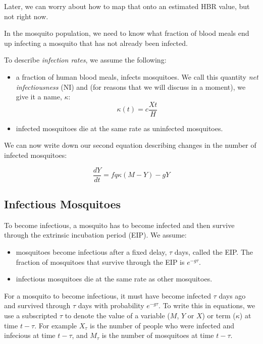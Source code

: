 \documentclass[
]{book}
\begin{document}
Later, we can worry about how to map that onto an estimated HBR value, but not right now.

In the mosquito population, we need to know what fraction of blood meals end up infecting a mosquito that has not already been infected.

To describe \emph{infection rates}, we assume the following:

\begin{itemize}
\item
  a fraction of human blood meals, infects mosquitoes. We call this quantity \emph{net infectiousness} (NI) and (for reasons that we will discuss in a moment), we give it a name, \(\kappa\): \[\kappa(t) = c \frac{X{t}}{H}\]
\item
  infected mosquitoes die at the same rate as uninfected mosquitoes.
\end{itemize}

We can now write down our second equation describing changes in the number of infected mosquitoes:

\begin{equation}
\frac{dY}{dt} = f q \kappa (M-Y) -g Y
\end{equation}

\hypertarget{infectious-mosquitoes}{%
\subsection{Infectious Mosquitoes}\label{infectious-mosquitoes}}

To become infectious, a mosquito has to become infected and then survive through the extrinsic incubation period (EIP). We assume:

\begin{itemize}
\item
  mosquitoes become infectious after a fixed delay, \(\tau\) days, called the EIP. The fraction of mosquitoes that survive through the EIP is \(e^{-g \tau}\).
\item
  infectious mosquitoes die at the same rate as other mosquitoes.
\end{itemize}

For a mosquito to become infectious, it must have become infected \(\tau\) days ago and survived through \(\tau\) days with probability \(e^{-g\tau}\). To write this in equations, we use a subscripted \(\tau\) to denote the value of a variable (\(M\), \(Y\) or \(X\)) or term (\(\kappa\)) at time \(t-\tau\). For example \(X_\tau\) is the number of people who were infected and infecious at time \(t-\tau\), and \(M_\tau\) is the number of mosquitoes at time \(t-\tau\).
\end{document}
